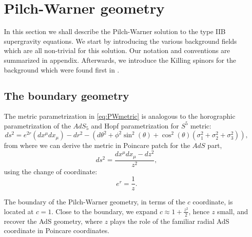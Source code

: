 \section{Pilch-Warner geometry}\label{sec:PWB}

In this section we shall describe the Pilch-Warner solution to the type IIB supergravity equations.
We start by introducing the various background fields which are all non-trivial for this solution.
Our notation and conventions are summarized in appendix.
Afterwards, we introduce the Killing spinors for the background which were found first in \cite{Pilch:2003jg}.

\subsection{The boundary geometry}

The metric parametrization in \eqref{eq:PWmetric} is analogous to the horographic parametrization of the $AdS_5$ and Hopf parametrization for $S^5$ metric:
\begin{equation*}
ds^2=e^{2 r}\left(dx^\mu dx_\mu \right)-dr^2 -\left(d\theta^2+\phi^2 \sin ^2(\theta )+\cos ^2(\theta ) \left(\sigma_1^2+\sigma_2^2+\sigma_3^2\right)\right),
\end{equation*}
from where we can derive the metric in Poincare patch for the $AdS$ part,
\begin{equation*}
ds^2=\frac{dx^{\mu } dx_{\mu}-dz^2}{z^2},
\end{equation*}{}
using the change of coordinate:
\begin{equation*}
e^r=\frac{1}{z}.
\end{equation*}{}


The boundary of the Pilch-Warner geometry, in terms of the $c$ coordinate, is located at $c = 1$. 
Close to the boundary, we expand $c \approx 1 + \frac{z^2}{2}$, hence $z$ small, and recover the AdS geometry, where $z$ plays the role of the familiar radial AdS coordinate in Poincare coordinates.





